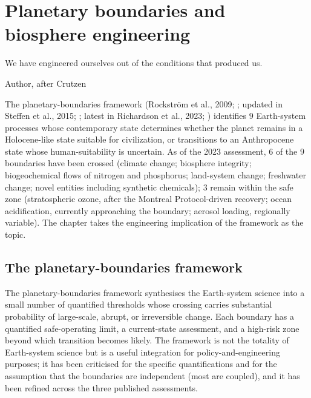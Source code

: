 \chapter{Planetary boundaries and biosphere engineering}
\label{vol12:ch12}

\epigraph{We have engineered ourselves out of the conditions that produced us.}{Author, after Crutzen}


\noindent
The planetary-boundaries framework (Rockstr{\"o}m et al., 2009; \cite{paper:rockstrom-2009}; updated in Steffen et al., 2015; \cite{paper:steffen-2015}; latest in Richardson et al., 2023; \cite{paper:richardson-2023}) identifies $9$ Earth-system processes whose contemporary state determines whether the planet remains in a Holocene-like state suitable for civilization, or transitions to an Anthropocene state whose human-suitability is uncertain. As of the 2023 assessment, $6$ of the $9$ boundaries have been crossed (climate change; biosphere integrity; biogeochemical flows of nitrogen and phosphorus; land-system change; freshwater change; novel entities including synthetic chemicals); $3$ remain within the safe zone (stratospheric ozone, after the Montreal Protocol-driven recovery; ocean acidification, currently approaching the boundary; aerosol loading, regionally variable). The chapter takes the engineering implication of the framework as the topic.

\section{The planetary-boundaries framework}

The planetary-boundaries framework synthesises the Earth-system science into a small number of quantified thresholds whose crossing carries substantial probability of large-scale, abrupt, or irreversible change. Each boundary has a quantified safe-operating limit, a current-state assessment, and a high-risk zone beyond which transition becomes likely. The framework is not the totality of Earth-system science but is a useful integration for policy-and-engineering purposes; it has been criticised for the specific quantifications and for the assumption that the boundaries are independent (most are coupled), and it has been refined across the three published assessments.


